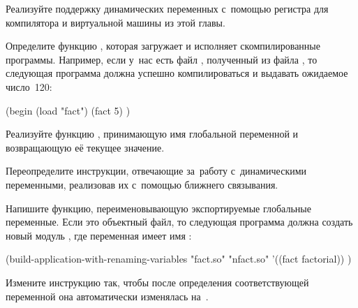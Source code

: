\begin{exercise}\label{compilation/ex:dynamic}
Реализуйте поддержку динамических переменных с~помощью регистра 
для компилятора и виртуальной машины из этой главы.
\end{exercise}

\begin{exercise}\label{compilation/ex:load}
Определите функцию , которая загружает и исполняет скомпилированные
программы. Например, если у~нас есть файл , полученный из файла
, то следующая программа должна успешно компилироваться и выдавать
ожидаемое число~120:

\begin{code:lisp}
(begin (load "fact")
       (fact 5) )
\end{code:lisp}
\end{exercise}

\begin{exercise}\label{compilation/ex:global-value}
Реализуйте функцию , принимающую имя глобальной переменной
и возвращающую её текущее значение.
\end{exercise}

\begin{exercise}\label{compilation/ex:shallow-dynamic}
Переопределите инструкции, отвечающие за~работу с~динамическими переменными,
реализовав их с~помощью ближнего связывания.
\end{exercise}

\begin{exercise}\label{compilation/ex:export-rename}
Напишите функцию, переименовывающую экспортируемые глобальные переменные. Если
 это объектный файл, то следующая программа должна создать новый
модуль , где переменная  имеет имя :

\begin{code:lisp}
(build-application-with-renaming-variables
 "fact.so" "nfact.so" '((fact factorial)) )
\end{code:lisp}
\end{exercise}

\begin{exercise}\label{compilation/ex:unchecked-ref}
Измените инструкцию  так, чтобы после определения
соответствующей переменной она автоматически изменялась на~.
\end{exercise}

